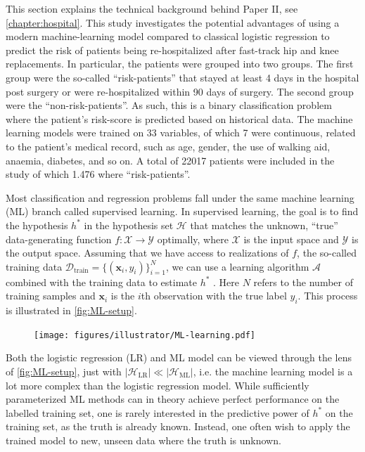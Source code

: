
This section explains the technical background behind Paper II, see \autoref{chapter:hospital}. This study investigates the potential advantages of using a modern machine-learning model compared to classical logistic regression to predict the risk of patients being re-hospitalized after fast-track hip and knee replacements. In particular, the patients were grouped into two groups. The first group were the so-called ``risk-patients'' that stayed at least 4 days in the hospital post surgery or were re-hospitalized within 90 days of surgery. The second group were the ``non-risk-patients''. As such, this is a binary classification problem where the patient's risk-score is predicted based on historical data. The machine learning models were trained on 33 variables, of which 7 were continuous, related to the patient's medical record, such as age, gender, the use of walking aid, anaemia, diabetes, and so on. A total of 22017 patients were included in the study of which 1.476 where ``risk-patients''.


Most classification and regression problems fall under the same machine learning (ML) branch called supervised learning. In supervised learning, the goal is to find the hypothesis $h^*$ in the hypothesis set $\mathcal{H}$ that matches the unknown, ``true'' data-generating function $f: \mathcal{X} \rightarrow \mathcal{Y}$ optimally, where $\mathcal{X}$ is the input space and $\mathcal{Y}$ is the output space. Assuming that we have access to realizations of $f$, the so-called training data $\mathcal{D}_\mathrm{train} = \{(\mathbf{x}_i, y_i)\}_{i=1}^N$, we can use a learning algorithm $\mathcal{A}$ combined with the training data to estimate $h^*$ \autocite{abu-mostafaLearningData2012a}. Here $N$ refers to the number of training samples and $\mathbf{x}_i$ is the $i$th observation with the true label $y_i$. This process is illustrated in \autoref{fig:ML-setup}.

\begin{figure}[htbp]
    \centering
    \texttt{[image: figures/illustrator/ML-learning.pdf]}
\end{figure}

Both the logistic regression (LR) and ML model can be viewed through the lens of \autoref{fig:ML-setup}, just with $|\mathcal{H}_\mathrm{LR}| \ll |\mathcal{H}_\mathrm{ML}|$, i.e. the machine learning model is a lot more complex than the logistic regression model. While sufficiently parameterized ML methods can in theory achieve perfect performance on the labelled training set, one is rarely interested in the predictive power of $h^*$ on the training set, as the truth is already known. Instead, one often wish to apply the trained model to new, unseen data where the truth is unknown.


